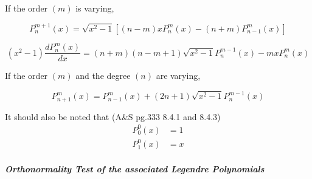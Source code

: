 \documentclass{revtex4-1}
\begin{document}
If the order $(m)$ is varying,

\begin{equation}
P^{m+1}_{n}(x) = \sqrt{x^{2}-1} [(n-m)xP^{m}_{n}(x)-(n+m)P^{m}_{n-1}(x)]
\end{equation}

\begin{equation}
(x^{2}-1)\frac{dP^{m}_{n}(x)}{dx}=(n+m)(n-m+1)\sqrt{x^{2}-1}P^{m-1}_{n}(x)-m x P^{m}_{n}(x)
\end{equation}

If the order $(m)$ and the degree $(n)$ are varying,

\begin{equation}
P^{m}_{n+1}(x)=P^{m}_{n-1}(x)+(2n+1)\sqrt{x^{2}-1}P^{m-1}_{n}(x)
\end{equation}

It should also be noted that (A\&S pg.333 8.4.1 and 8.4.3)
\begin{align}
P^{0}_{0}(x) &= 1\\
P^{0}_{1}(x) &= x
\end{align}


\subparagraph{Orthonormality Test of the associated Legendre Polynomials}\label{S:assocLegPolyOrthonormTest}
\end{document}
